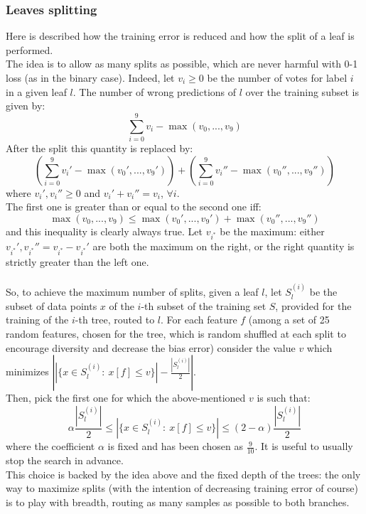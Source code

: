 \documentclass[12pt]{article}
\begin{document}
\subsubsection{Leaves splitting}
Here is described how the training error is reduced and how the split of a leaf is performed.\\
The idea is to allow as many splits as possible, which are never harmful with 0-1 loss (as in the binary case). Indeed, let $v_i \ge 0$ be the number of votes for label $i$ in a given leaf $l$. The number of wrong predictions of $l$ over the training subset is given by:
$$\sum_{i=0}^9 v_i - \max(v_0, ..., v_9)$$
After the split this quantity is replaced by:
$$\left(\sum_{i=0}^9 v_i' - \max(v_0', ..., v_9')\right) + \left(\sum_{i=0}^9 v_i'' - \max(v_0'', ..., v_9'')\right)$$
where $v_i', v_i'' \ge 0$ and $v_i' + v_i'' = v_i$, $\forall i$.\\
The first one is greater than or equal to the second one iff:
$$\max(v_0, ..., v_9) \le \max(v_0', ..., v_9') + \max(v_0'', ..., v_9'')$$
and this inequality is clearly always true. Let $v_{i^*}$ be the maximum: either $v_{i^*}', v_{i^*}'' = v_{i^*} - v_{i^*}'$ are both the maximum on the right, or the right quantity is strictly greater than the left one.\\\\
So, to achieve the maximum number of splits, given a leaf $l$, let $S_l^{(i)}$ be the subset of data points $x$ of the $i$-th subset of the training set $S$, provided for the training of the $i$-th tree, routed to $l$. For each feature $f$ (among a set of 25 random features, chosen for the tree, which is random shuffled at each split to encourage diversity and decrease the bias error) consider the value $v$ which minimizes $\left| \left| \{ x \in S_l^{(i)}:\ x \left[ f \right] \le v \} \right| - \frac{\left| S_l^{(i)} \right|}{2} \right|$.\\
Then, pick the first one for which the above-mentioned $v$ is such that:
$$\alpha \frac{\left| S_l^{(i)} \right|}{2} \le \left| \{ x \in S_l^{(i)}:\ x \left[ f \right] \le v \} \right| \le (2 -\alpha) \frac{\left| S_l^{(i)} \right|}{2}$$
where the coefficient $\alpha$ is fixed and has been chosen as $\frac{9}{10}$. It is useful to usually stop the search in advance.\\
This choice is backed by the idea above and the fixed depth of the trees: the only way to maximize splits (with the intention of decreasing training error of course) is to play with breadth, routing as many samples as possible to both branches.\\
\end{document}

